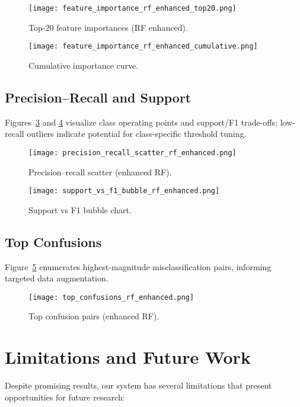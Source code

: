 \documentclass[conference]{IEEEtran}
\begin{document}
\begin{figure}[t]
  \centering
  \texttt{[image: feature\_importance\_rf\_enhanced\_top20.png]}
  \caption{Top-20 feature importances (RF enhanced).}
  \label{fig:feat_importance_top}
\end{figure}

\begin{figure}[t]
  \centering
  \texttt{[image: feature\_importance\_rf\_enhanced\_cumulative.png]}
  \caption{Cumulative importance curve.}
  \label{fig:feat_importance_cum}
\end{figure}

\subsection{Precision--Recall and Support}
Figures~\ref{fig:precision_recall_scatter} and \ref{fig:support_f1_bubble} visualize class operating points and support/F1 trade-offs; low-recall outliers indicate potential for class-specific threshold tuning.

\begin{figure}[t]
  \centering
  \texttt{[image: precision\_recall\_scatter\_rf\_enhanced.png]}
  \caption{Precision--recall scatter (enhanced RF).}
  \label{fig:precision_recall_scatter}
\end{figure}

\begin{figure}[t]
  \centering
  \texttt{[image: support\_vs\_f1\_bubble\_rf\_enhanced.png]}
  \caption{Support vs F1 bubble chart.}
  \label{fig:support_f1_bubble}
\end{figure}

\subsection{Top Confusions}
Figure~\ref{fig:top_confusions} enumerates highest-magnitude misclassification pairs, informing targeted data augmentation.

\begin{figure}[t]
  \centering
  \texttt{[image: top\_confusions\_rf\_enhanced.png]}
  \caption{Top confusion pairs (enhanced RF).}
  \label{fig:top_confusions}
\end{figure}

\section{Limitations and Future Work}
Despite promising results, our system has several limitations that present opportunities for future research:
\end{document}
